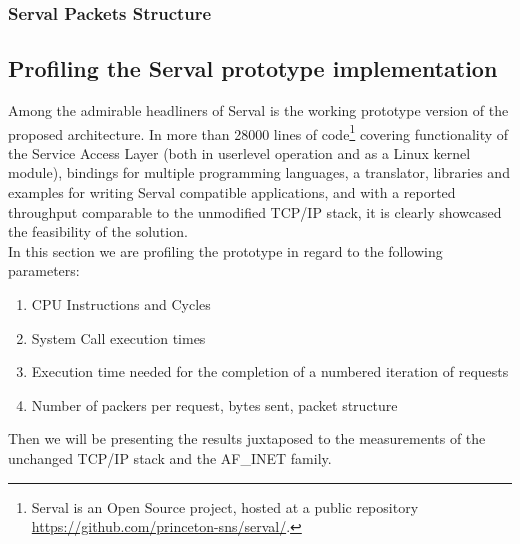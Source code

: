 \subsubsection{Serval Packets Structure}



\subsection{Profiling the Serval prototype implementation}
Among the admirable headliners of Serval is the working prototype version of the proposed architecture.
In more than 28000 lines of code\footnote{Serval is an Open Source project, hosted at a public repository\\ \url{https://github.com/princeton-sns/serval/}.} covering functionality of the Service Access Layer (both in userlevel operation and as a Linux kernel module), bindings for multiple programming languages, a translator, libraries and examples for writing Serval compatible applications, and with a reported throughput comparable to the unmodified TCP/IP stack, it is clearly showcased the feasibility of the solution.
\\ \indent In this section we are profiling the prototype in regard to the following parameters:
\begin{enumerate}
  \item CPU Instructions and Cycles
  \item System Call execution times
  \item Execution time needed for the completion of a numbered iteration of requests
  \item Number of packers per request, bytes sent, packet structure
\end{enumerate}
Then we will be presenting the results juxtaposed to the measurements of the unchanged TCP/IP stack and the AF\_INET family.

